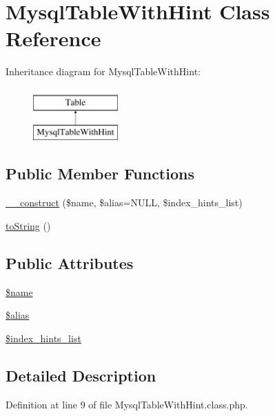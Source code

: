 \hypertarget{classMysqlTableWithHint}{\section{Mysql\-Table\-With\-Hint Class Reference}
\label{classMysqlTableWithHint}
}
Inheritance diagram for Mysql\-Table\-With\-Hint\-:\begin{figure}[H]
\begin{center}
\leavevmode
\includegraphics[height=2.000000cm]{classMysqlTableWithHint}
\end{center}
\end{figure}
\subsection*{Public Member Functions}
\begin{DoxyCompactItemize}
\item 
\hyperlink{classMysqlTableWithHint_a6dfb6078bc577dda433d08a2235f58d4}{\-\_\-\-\_\-construct} (\$name, \$alias=N\-U\-L\-L, \$index\-\_\-hints\-\_\-list)
\item 
\hyperlink{classMysqlTableWithHint_ad4123d7369e2e100a6189767d3d7e78b}{to\-String} ()
\end{DoxyCompactItemize}
\subsection*{Public Attributes}
\begin{DoxyCompactItemize}
\item 
\hyperlink{classMysqlTableWithHint_a38c6eb1620ea15d06902d2fafb991776}{\$name}
\item 
\hyperlink{classMysqlTableWithHint_a71f2f396bdbde2b55444e8f142c31816}{\$alias}
\item 
\hyperlink{classMysqlTableWithHint_ac389d7382100dd008addab6fbbbe0032}{\$index\-\_\-hints\-\_\-list}
\end{DoxyCompactItemize}


\subsection{Detailed Description}


Definition at line 9 of file Mysql\-Table\-With\-Hint.\-class.\-php.



